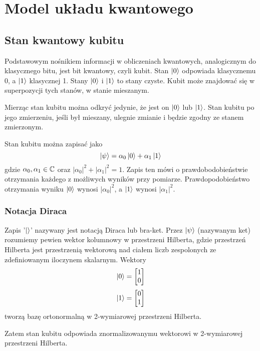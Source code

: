 \chapter{Model układu kwantowego}
\thispagestyle{chapterBeginStyle}
\label{rozdzial0b}
\section{Stan kwantowy kubitu}
Podstawowym nośnikiem informacji w obliczeniach kwantowych, analogicznym do klasycznego bitu, jest bit kwantowy, czyli kubit. Stan $\ket{0}$ odpowiada klasycznemu 0, a $\ket{1}$ klasycznej 1. Stany $\ket{0}$ i $\ket{1}$ to stany czyste. Kubit może znajdować się w superpozycji tych stanów, w stanie mieszanym. 
\par Mierząc stan kubitu można odkryć jedynie, że jest on $\ket{0}$ lub $\ket{1}$. Stan kubitu po jego zmierzeniu, jeśli był mieszany, ulegnie zmianie i będzie zgodny ze stanem zmierzonym.
\par Stan kubitu można zapisać jako
\[\ket{\psi} = \alpha_0\ket{0} + \alpha_1\ket{1}\]
gdzie $\alpha_0, \alpha_1 \in \mathbb{C}$ oraz $\left|\alpha_0\right|^2 + \left|\alpha_1\right|^2 = 1$. Zapis ten mówi o prawdobodobieństwie otrzymania każdego z możliwych wyników przy pomiarze. Prawdopodobieństwo otrzymania wyniku $\ket{0}$ wynosi $\left|\alpha_0\right|^2$, a $\ket{1}$ wynosi $\left|\alpha_1\right|^2$.
\subsection{Notacja Diraca}
Zapis '$\ket{}$' nazywany jest notacją Diraca lub bra-ket. 
Przez $\ket{\psi}$ (nazywanym ket) rozumiemy pewien wektor kolumnowy w przestrzeni Hilberta, gdzie przestrzeń Hilberta jest przestrzenią wektorową nad ciałem liczb zespolonych ze zdefiniowanym iloczynem skalarnym.
Wektory 
\[
    \ket{0}
    =
    \begin{bmatrix}
        1 \\
        0 \\
    \end{bmatrix}
\] 
\[
    \ket{1}
    =
    \begin{bmatrix}
        0 \\
        1 \\
    \end{bmatrix}
\] tworzą bazę ortonormalną w 2-wymiarowej przestrzeni Hilberta.
\par Zatem stan kubitu odpowiada znormalizowanymu wektorowi w 2-wymiarowej przestrzeni Hilberta.
